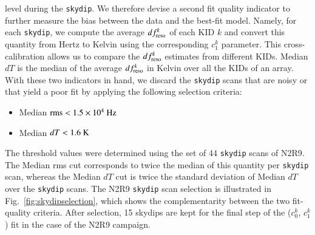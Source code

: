 \documentclass[traditionalabstract]{aa}
\newcommand{\lp}[1]{#1}
\begin{document}
{level during the {\tt skydip}. We therefore devise a second fit quality
indicator to further measure the bias between the data and the
best-fit model.
Namely, for each {\tt skydip}, we compute the average
$df_{\rm{reso}}^k$ of each KID $k$ and convert this quantity from Hertz to Kelvin
using the corresponding $c_1^k$ parameter. This cross-calibration
allows us to compare the $df_{\rm{reso}}^k$ estimates from different KIDs.
Median $dT$ is the median of the average $df_{\rm{reso}}^k$ in Kelvin over all the KIDs of an
array. With these two indicators in hand, we discard the {\tt skydip} scans
that are noisy or that yield a poor fit by applying the following selection
criteria:
\begin{itemize}
\item Median $\rm{rms} < 1.5 \times 10^{4}~\rm{Hz}$
\item Median $dT < 1.6~\rm{K}$
\end{itemize}

The threshold values were determined using the set of 44 {\tt skydip}
scans of N2R9. The Median rms cut corresponds to twice the median of
this quantity per {\tt skydip} scan, whereas the Median $dT$ cut is twice
the standard deviation of Median $dT$ over the {\tt skydip} scans.
The N2R9 {\tt skydip} scan selection is illustrated in
{\lp Fig.~\ref{fig:skydipselection},
which shows the complementarity between the two fit-quality
criteria. After selection, 15 skydips are kept for the final step of
the ($c_0^k$, $c_1^k$) fit in the case of the N2R9 campaign.}

}
\end{document}
